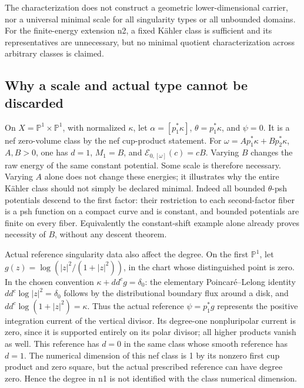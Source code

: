 \documentclass[
  11pt,
]{article}
\begin{document}
The characterization does not construct a geometric lower-dimensional
carrier, nor a universal minimal scale for all singularity types or all
unbounded domains. For the finite-energy extension n2, a fixed Kähler
class is sufficient and its representatives are unnecessary, but no
minimal quotient characterization across arbitrary classes is claimed.

\subsection{Why a scale and actual type cannot be
discarded}\label{why-a-scale-and-actual-type-cannot-be-discarded}

On \(X=\mathbb P^1\times\mathbb P^1\), with normalized \(\kappa\), let
\(\alpha=[p_1^*\kappa]\), \(\theta=p_1^*\kappa\), and \(\psi=0\). It is
a nef zero-volume class by the nef cup-product statement. For
\(\omega=A p_1^*\kappa+B p_2^*\kappa\), \(A,B>0\), one has \(d=1\),
\(M_1=B\), and \(\mathcal E_{0,[\omega]}(c)=cB\). Varying \(B\) changes
the raw energy of the same constant potential. Some scale is therefore
necessary. Varying \(A\) alone does not change these energies; it
illustrates why the entire Kähler class should not simply be declared
minimal. Indeed all bounded \(\theta\)-psh potentials descend to the
first factor: their restriction to each second-factor fiber is a psh
function on a compact curve and is constant, and bounded potentials are
finite on every fiber. Equivalently the constant-shift example alone
already proves necessity of \(B\), without any descent theorem.

Actual reference singularity data also affect the degree. On the first
\(\mathbb P^1\), let \(g(z)=\log(|z|^2/(1+|z|^2))\), in the chart whose
distinguished point is zero. In the chosen convention
\(\kappa+dd^cg=\delta_0\): the elementary Poincaré--Lelong identity
\(dd^c\log|z|^2=\delta_0\) follows by the distributional boundary flux
around a disk, and \(dd^c\log(1+|z|^2)=\kappa\). Thus the actual
reference \(\psi=p_1^*g\) represents the positive integration current of
the vertical divisor. Its degree-one nonpluripolar current is zero,
since it is supported entirely on its polar divisor; all higher products
vanish as well. This reference has \(d=0\) in the same class whose
smooth reference has \(d=1\). The numerical dimension of this nef class
is 1 by its nonzero first cup product and zero square, but the actual
prescribed reference can have degree zero. Hence the degree in n1 is not
identified with the class numerical dimension.
\end{document}
